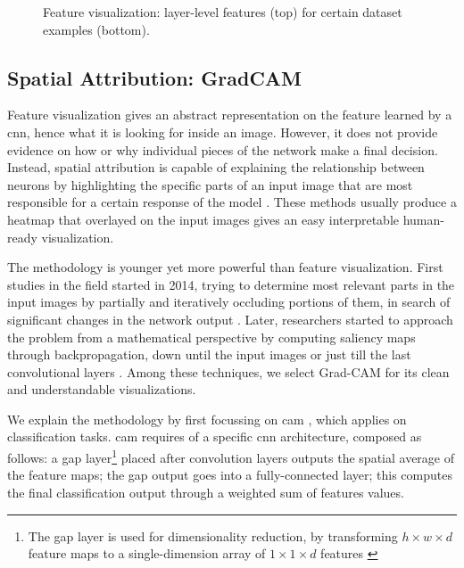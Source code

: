 \begin{figure}[!htb]
\begin{center}
\begin{subfigure}[h]{0.23\textwidth}
		\end{subfigure}
	\end{center}
	\vspace{-0.5cm}
	\caption[Feature visualization: layer-level features for certain dataset example]{Feature visualization: layer-level features (top) for certain dataset examples (bottom).}
	\label{fig:feature-visual-1}
\end{figure}



\subsection{Spatial Attribution: GradCAM}
\label{subsec:gradcam-theory}

Feature visualization gives an abstract representation on the feature learned by a \gls{cnn}, hence what it is looking for inside an image. However, it does not provide evidence on how or why individual pieces of the network make a final decision. Instead, spatial attribution is capable of explaining the relationship between neurons by highlighting the specific parts of an input image that are most responsible for a certain response of the model \cite{olah2018the}. These methods usually produce a heatmap that overlayed on the input images gives an easy interpretable human-ready visualization.

The methodology is younger yet more powerful than feature visualization. First studies in the field started in 2014, trying to determine most relevant parts in the input images by partially and iteratively occluding portions of them, in search of significant changes in the network output \cite{zeiler2013visualizing}. Later, researchers started to approach the problem from a mathematical perspective by computing saliency maps through backpropagation, down until the input images \cite{simonyan2014deep} or just till the last convolutional layers \cite{zhou2015learning, Selvaraju_2019}. Among these techniques, we select Grad-CAM \cite{Selvaraju_2019} for its clean and understandable visualizations.

\medskip

We explain the methodology by first focussing on \gls{cam} \cite{zhou2015learning}, which applies on classification tasks. \gls{cam} requires of a specific \gls{cnn} architecture, composed as follows: a \gls{gap} layer\footnote{The \gls{gap} layer is used for dimensionality reduction, by transforming $h \times w \times d$ feature maps to a single-dimension array of $1 \times 1 \times d$ features \cite{gap_layers}} placed after convolution layers outputs the spatial average of the feature maps; the \gls{gap} output goes into a fully-connected layer; this computes the final classification output through a weighted sum of features values.

